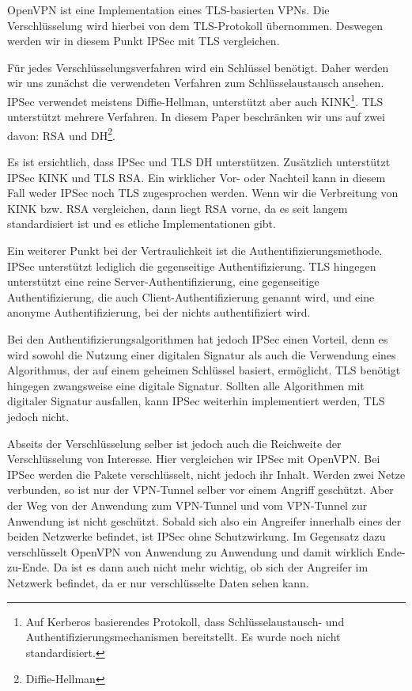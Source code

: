 \documentclass[12pt]{scrartcl}
\begin{document}
OpenVPN ist eine Implementation eines TLS-basierten VPNs. Die Verschlüsselung wird hierbei von dem TLS-Protokoll übernommen. Deswegen werden wir in diesem Punkt IPSec mit TLS vergleichen.

Für jedes Verschlüsselungsverfahren wird ein Schlüssel benötigt. Daher werden wir uns zunächst die verwendeten Verfahren zum Schlüsselaustausch ansehen. IPSec verwendet meistens Diffie-Hellman, unterstützt aber auch KINK\footnote{Auf Kerberos basierendes Protokoll, dass Schlüsselaustausch- und Authentifizierungsmechanismen bereitstellt. Es wurde noch nicht standardisiert\cite{Alshamsi2005}.}. TLS unterstützt mehrere Verfahren. In diesem Paper beschränken wir uns auf zwei davon: RSA und DH\footnote{Diffie-Hellman}\cite{Alshamsi2005}. %


Es ist ersichtlich, dass IPSec und TLS DH unterstützen. Zusätzlich unterstützt IPSec KINK und TLS RSA. Ein wirklicher Vor- oder Nachteil kann in diesem Fall weder IPSec noch TLS zugesprochen werden. Wenn wir die Verbreitung von KINK bzw. RSA vergleichen, dann liegt RSA vorne, da es seit langem standardisiert ist und es etliche Implementationen gibt.

Ein weiterer Punkt bei der Vertraulichkeit ist die Authentifizierungsmethode. IPSec unterstützt lediglich die gegenseitige Authentifizierung. TLS hingegen unterstützt eine reine Server-Authentifizierung, eine gegenseitige Authentifizierung, die auch Client-Authentifizierung genannt wird, und eine anonyme Authentifizierung, bei der nichts authentifiziert wird.\cite{Alshamsi2005}

Bei den Authentifizierungsalgorithmen hat jedoch IPSec einen Vorteil, denn es wird sowohl die Nutzung einer digitalen Signatur als auch die Verwendung eines Algorithmus, der auf einem geheimen Schlüssel basiert, ermöglicht. TLS benötigt hingegen zwangsweise eine digitale Signatur. Sollten alle Algorithmen mit digitaler Signatur ausfallen, kann IPSec weiterhin implementiert werden, TLS jedoch nicht.\cite{Alshamsi2005}

Abseits der Verschlüsselung selber ist jedoch auch die Reichweite der Verschlüsselung von Interesse. Hier vergleichen wir IPSec mit OpenVPN. Bei IPSec werden die Pakete verschlüsselt, nicht jedoch ihr Inhalt. Werden zwei Netze verbunden, so ist nur der VPN-Tunnel selber vor einem Angriff geschützt. Aber der Weg von der Anwendung zum VPN-Tunnel und vom VPN-Tunnel zur Anwendung ist nicht geschützt. Sobald sich also ein Angreifer innerhalb eines der beiden Netzwerke befindet, ist IPSec ohne Schutzwirkung.
Im Gegensatz dazu verschlüsselt OpenVPN von Anwendung zu Anwendung und damit wirklich Ende-zu-Ende. Da ist es dann auch nicht mehr wichtig, ob sich der Angreifer im Netzwerk befindet, da er nur verschlüsselte Daten sehen kann.\cite{Sun2011}
\end{document}
